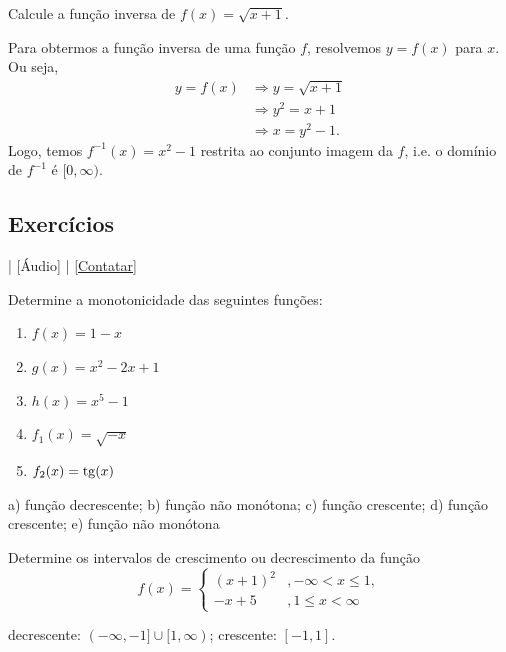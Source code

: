 \begin{exeresol}
  Calcule a função inversa de $f(x) = \sqrt{x+1}$.
\end{exeresol}
\begin{resol}
  Para obtermos a função inversa de uma função $f$, resolvemos $y = f(x)$ para $x$. Ou seja,
  \begin{align}
    y = f(x) &\Rightarrow y = \sqrt{x+1}\\
             &\Rightarrow y^2 = x+1\\
             &\Rightarrow x = y^2 - 1.
  \end{align}
  Logo, temos $f^{-1}(x) = x^2 - 1$ restrita ao conjunto imagem da $f$, i.e. o domínio de $f^{-1}$ é $[0, \infty)$.
\end{resol}

\subsection*{Exercícios}

\begin{flushright}
  [Vídeo] | [Áudio] | \href{https://phkonzen.github.io/notas/contato.html}{[Contatar]}
\end{flushright}

\begin{exer}
  Determine a monotonicidade das seguintes funções:
  \begin{enumerate}
  \item $f(x)=1-x$
  \item $g(x)=x^2-2x+1$
  \item $h(x)=x^5-1$
  \item $f_1(x) = \sqrt{-x}$
  \item $f_2(x) = \operatorname{tg}(x)$
  \end{enumerate}
\end{exer}
\begin{resp}
  a) função decrescente; b) função não monótona; c) função crescente; d) função crescente; e) função não monótona 
\end{resp}

\begin{exer}
  Determine os intervalos de crescimento ou decrescimento da função
  \begin{equation}
    f(x) = \left\{
      \begin{array}{ll}
        (x+1)^2 &, -\infty < x \leq 1,\\
        -x+5 &, 1 \leq x < \infty
      \end{array}
\right.
  \end{equation}
\end{exer}
\begin{resp}
  decrescente: $(-\infty, -1]\cup [1, \infty)$; crescente: $[-1, 1]$.
\end{resp}

